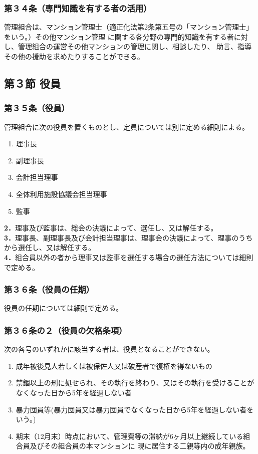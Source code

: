 \documentclass[12pt,uplatex,dvipdfmx]{jsarticle}
\begin{document}
\subsubsection*{第３４条（専門知識を有する者の活用）}
管理組合は、マンション管理士（適正化法第2条第五号の「マンション管理士」をいう。）その他マンション管理
に関する各分野の専門的知識を有する者に対し、管理組合の運営その他マンションの管理に関し、相談したり、
助言、指導その他の援助を求めたりすることができる。

\begin{center}
\subsection*{第３節 役員}
\end{center}
\subsubsection*{第３５条（役員）}
管理組合に次の役員を置くものとし、定員については別に定める細則による。
\begin{enumerate}
\item 理事長
\item 副理事長
\item 会計担当理事
\item 全体利用施設協議会担当理事
\item 監事
\end{enumerate}
\textbf{2．}理事及び監事は、総会の決議によって、選任し、又は解任する。\\
\textbf{3．}理事長、副理事長及び会計担当理事は、理事会の決議によって、理事のうちから選任し、又は解任する。\\
\textbf{4．}組合員以外の者から理事又は監事を選任する場合の選任方法については細則で定める。\\
\subsubsection*{第３６条（役員の任期）}
役員の任期については細則で定める。
\subsubsection*{第３６条の２（役員の欠格条項）}
次の各号のいずれかに該当する者は、役員となることができない。
\begin{enumerate}
\item 成年被後見人若しくは被保佐人又は破産者で復権を得ないもの
\item 禁錮以上の刑に処せられ、その執行を終わり、又はその執行を受けることがなくなった日から5年を経過しない者
\item 暴力団員等(暴力団員又は暴力団員でなくなった日から5年を経過しない者をいう。)
\item 期末（12月末）時点において、管理費等の滞納が6ヶ月以上継続している組合員及びその組合員の本マンションに
現に居住する二親等内の成年親族。
\end{enumerate}
\end{document}
